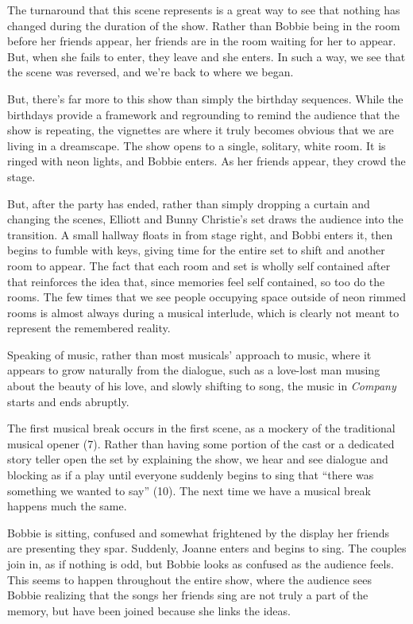 \documentclass[12pt]{article}[titlepage]
\newcommand{\say}[1]{``#1''}
\newcommand{\1}{\={a}}
\newcommand{\2}{\={e}}
\newcommand{\3}{\={\i}}
\newcommand{\4}{\=o}
\newcommand{\5}{\=u}
\newcommand{\6}{\={A}}
\renewcommand{\,}{\textsuperscript{,}}
\begin{document}
The turnaround that this scene represents is a great way to see that nothing has changed during the duration of the show.
Rather than Bobbie being in the room before her friends appear, her friends are in the room waiting for her to appear.
But, when she fails to enter, they leave and she enters.
In such a way, we see that the scene was reversed, and we're back to where we began.

But, there's far more to this show than simply the birthday sequences.
While the birthdays provide a framework and regrounding to remind the audience that the show is repeating, the vignettes are where it truly becomes obvious that we are living in a dreamscape.
The show opens to a single, solitary, white room.
It is ringed with neon lights, and Bobbie enters.
As her friends appear, they crowd the stage.

But, after the party has ended, rather than simply dropping a curtain and changing the scenes, Elliott and Bunny Christie's set draws the audience into the transition.
A small hallway floats in from stage right, and Bobbi enters it, then begins to fumble with keys, giving time for the entire set to shift and another room to appear.
The fact that each room and set is wholly self contained after that reinforces the idea that, since memories feel self contained, so too do the rooms.
The few times that we see people occupying space outside of neon rimmed rooms is almost always during a musical interlude, which is clearly not meant to represent the remembered reality.

Speaking of music, rather than most musicals' approach to music, where it appears to grow naturally from the dialogue, such as a love-lost man musing about the beauty of his love, and slowly shifting to song, the music in \textit{Company} starts and ends abruptly.

The first musical break occurs in the first scene, as a mockery of the traditional musical opener (7).
Rather than having some portion of the cast or a dedicated story teller open the set by explaining the show, we hear and see dialogue and blocking as if a play until everyone suddenly begins to sing that \say{there was something we wanted to say} (10).
The next time we have a musical break happens much the same.

Bobbie is sitting, confused and somewhat frightened by the display her friends are presenting they spar.
Suddenly, Joanne enters and begins to sing.
The couples join in, as if nothing is odd, but Bobbie looks as confused as the audience feels.
This seems to happen throughout the entire show, where the audience sees Bobbie realizing that the songs her friends sing are not truly a part of the memory, but have been joined because she links the ideas.
\end{document}
